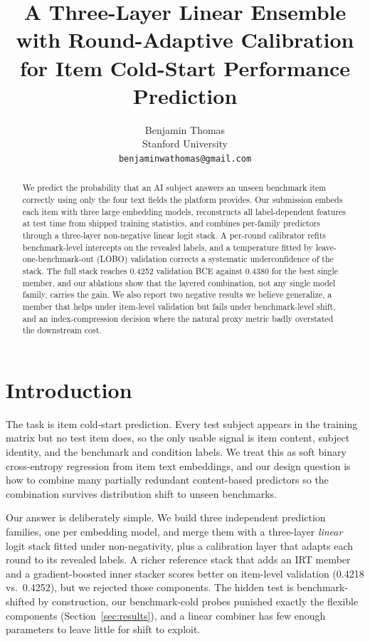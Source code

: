 \documentclass{article}
\title{A Three-Layer Linear Ensemble with Round-Adaptive Calibration\\for Item Cold-Start Performance Prediction}
\author{%
  Benjamin Thomas\\
  Stanford University\\
  \texttt{benjaminwathomas@gmail.com}
}
\begin{document}
\maketitle

\begin{abstract}
We predict the probability that an AI subject answers an unseen benchmark item correctly using only the four text fields the platform provides. Our submission embeds each item with three large embedding models, reconstructs all label-dependent features at test time from shipped training statistics, and combines per-family predictors through a three-layer non-negative linear logit stack. A per-round calibrator refits benchmark-level intercepts on the revealed labels, and a temperature fitted by leave-one-benchmark-out (LOBO) validation corrects a systematic underconfidence of the stack. The full stack reaches 0.4252 validation BCE against 0.4380 for the best single member, and our ablations show that the layered combination, not any single model family, carries the gain. We also report two negative results we believe generalize, a member that helps under item-level validation but fails under benchmark-level shift, and an index-compression decision where the natural proxy metric badly overstated the downstream cost.
\end{abstract}

\section{Introduction}

The task is item cold-start prediction. Every test subject appears in the training matrix but no test item does, so the only usable signal is item content, subject identity, and the benchmark and condition labels. We treat this as soft binary cross-entropy regression from item text embeddings, and our design question is how to combine many partially redundant content-based predictors so the combination survives distribution shift to unseen benchmarks.

Our answer is deliberately simple. We build three independent prediction families, one per embedding model, and merge them with a three-layer \emph{linear} logit stack fitted under non-negativity, plus a calibration layer that adapts each round to its revealed labels. A richer reference stack that adds an IRT member and a gradient-boosted inner stacker scores better on item-level validation (0.4218 vs.\ 0.4252), but we rejected those components. The hidden test is benchmark-shifted by construction, our benchmark-cold probes punished exactly the flexible components (Section~\ref{sec:results}), and a linear combiner has few enough parameters to leave little for shift to exploit.
\end{document}
